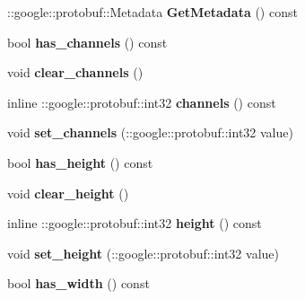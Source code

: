 \begin{DoxyCompactItemize}
\item 
\mbox{\label{classcaffe_1_1_datum_ad5415cfb3544b8ebebcc59658c5a9842}} 
\+::google\+::protobuf\+::\+Metadata {\bfseries Get\+Metadata} () const
\item 
\mbox{\label{classcaffe_1_1_datum_a51859bc1e457c15357574c6df3cdb7f4}} 
bool {\bfseries has\+\_\+channels} () const
\item 
\mbox{\label{classcaffe_1_1_datum_a4deee606d255027a97e69ebb3d9f23e6}} 
void {\bfseries clear\+\_\+channels} ()
\item 
\mbox{\label{classcaffe_1_1_datum_ade3d0f1aaa39554bf2d6dee2b06d5c8c}} 
inline \+::google\+::protobuf\+::int32 {\bfseries channels} () const
\item 
\mbox{\label{classcaffe_1_1_datum_ac271ac8407a7eb4c4467076d7f0f9dfe}} 
void {\bfseries set\+\_\+channels} (\+::google\+::protobuf\+::int32 value)
\item 
\mbox{\label{classcaffe_1_1_datum_ac814e685e4ae7e3ecaa55007f1938f05}} 
bool {\bfseries has\+\_\+height} () const
\item 
\mbox{\label{classcaffe_1_1_datum_a548de766415fb3de8f13b87e94bdfa72}} 
void {\bfseries clear\+\_\+height} ()
\item 
\mbox{\label{classcaffe_1_1_datum_a019a61f71c21e334a9ff23cdf2506aa8}} 
inline \+::google\+::protobuf\+::int32 {\bfseries height} () const
\item 
\mbox{\label{classcaffe_1_1_datum_aaf43b7c6981b279c78b902b7fd8e5d99}} 
void {\bfseries set\+\_\+height} (\+::google\+::protobuf\+::int32 value)
\item 
\mbox{\label{classcaffe_1_1_datum_a1cca86df8eacefbbd9169bd3f44feabc}} 
bool {\bfseries has\+\_\+width} () const
\item 
\mbox{\label{classcaffe_1_1_datum_a3d1502f4be11c3083549ad46edca344d}} 

\end{DoxyCompactItemize}
